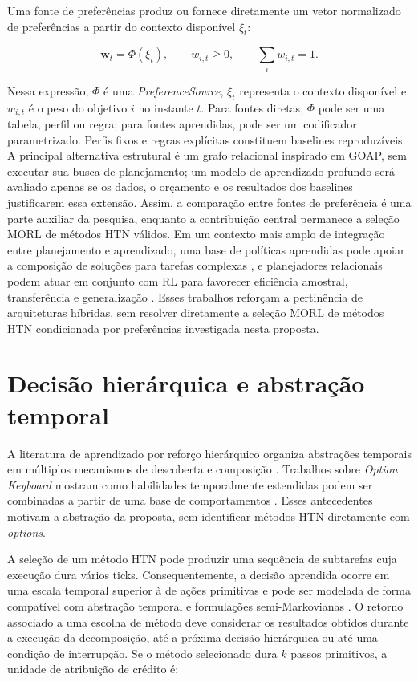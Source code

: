 Uma fonte de preferências produz ou fornece diretamente um vetor normalizado de
preferências a partir do contexto disponível $\xi_t$:

\begin{equation}
\mathbf{w}_t = \Phi(\xi_t),
\qquad
w_{i,t}\geq 0,
\qquad
\sum_i w_{i,t}=1.
\end{equation}

Nessa expressão, $\Phi$ é uma \textit{PreferenceSource}, $\xi_t$ representa o
contexto disponível e $w_{i,t}$ é o peso do objetivo $i$ no instante $t$. Para
fontes diretas, $\Phi$ pode ser uma tabela, perfil ou regra; para fontes
aprendidas, pode ser um codificador parametrizado.
Perfis fixos e regras explícitas constituem baselines reproduzíveis.
A principal alternativa estrutural é um grafo relacional inspirado em GOAP,
sem executar sua busca de planejamento; um modelo de aprendizado profundo será
avaliado apenas se os dados, o orçamento e os resultados dos baselines justificarem
essa extensão.
Assim, a comparação entre fontes de preferência é uma parte auxiliar da pesquisa, enquanto
a contribuição central permanece a seleção MORL de métodos HTN válidos.
Em um contexto mais amplo de integração entre planejamento e aprendizado, uma
base de políticas aprendidas pode apoiar a composição de soluções para tarefas
complexas \cite{kuric2024}, e planejadores relacionais podem atuar em conjunto
com RL para favorecer eficiência amostral, transferência e generalização
\cite{prabhakar2025}. Esses trabalhos reforçam a pertinência de arquiteturas
híbridas, sem resolver diretamente a seleção MORL de métodos HTN condicionada
por preferências investigada nesta proposta.

\section{Decisão hierárquica e abstração temporal}

A literatura de aprendizado por reforço hierárquico organiza abstrações temporais
em múltiplos mecanismos de descoberta e composição \cite{klissarov2025hrl}.
Trabalhos sobre \textit{Option Keyboard} mostram como habilidades temporalmente
estendidas podem ser combinadas a partir de uma base de comportamentos
\cite{barreto2019optionkeyboard,alegre2025optionkeyboard}. Esses antecedentes
motivam a abstração da proposta, sem identificar métodos HTN diretamente com
\textit{options}.

A seleção de um método HTN pode produzir uma sequência de subtarefas cuja
execução dura vários ticks.
Consequentemente, a decisão aprendida ocorre em uma escala temporal superior à
de ações primitivas e pode ser modelada de forma compatível com abstração
temporal e formulações semi-Markovianas \cite{sutton1999options,lin2024hipo}.
O retorno associado a uma escolha de método deve considerar os resultados obtidos
durante a execução da decomposição, até a próxima decisão hierárquica ou até uma
condição de interrupção.
Se o método selecionado dura $k$ passos primitivos, a unidade de atribuição de
crédito é:

